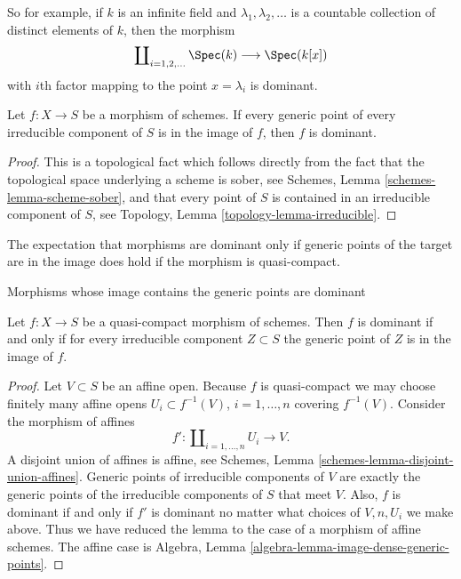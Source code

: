 \noindent
So for example, if $k$ is an infinite field and $\lambda_1, \lambda_2, \ldots$
is a countable collection of distinct elements of $k$, then the morphism
$$
\coprod\nolimits_{i = 1, 2, \ldots } \Spec(k)
\longrightarrow
\Spec(k[x])
$$
with $i$th factor mapping to the point $x = \lambda_i$ is dominant.

\begin{lemma}
\label{lemma-generic-points-in-image-dominant}
Let $f : X \to S$ be a morphism of schemes.
If every generic point of every irreducible component of $S$
is in the image of $f$, then $f$ is dominant.
\end{lemma}

\begin{proof}
This is a topological fact which follows directly from the fact that
the topological space underlying a scheme is sober, see
Schemes, Lemma \ref{schemes-lemma-scheme-sober}, and that
every point of $S$ is contained in an irreducible component of
$S$, see Topology, Lemma \ref{topology-lemma-irreducible}.
\end{proof}

\noindent
The expectation that morphisms are dominant only if generic points of the
target are in the image does hold if the morphism is quasi-compact.

\begin{lemma}
\label{lemma-quasi-compact-dominant}
\begin{slogan}
Morphisms whose image contains the generic points are dominant
\end{slogan}
Let $f : X \to S$ be a quasi-compact morphism of schemes.
Then $f$ is dominant if and only if for every irreducible
component $Z \subset S$ the generic point of $Z$ is in the
image of $f$.
\end{lemma}

\begin{proof}
Let $V \subset S$ be an affine open.
Because $f$ is quasi-compact we may choose finitely many affine
opens $U_i \subset f^{-1}(V)$, $i = 1, \ldots, n$ covering
$f^{-1}(V)$. Consider the morphism of affines
$$
f' :
\coprod\nolimits_{i = 1, \ldots, n} U_i
\longrightarrow
V.
$$
A disjoint union of affines is affine, see
Schemes, Lemma \ref{schemes-lemma-disjoint-union-affines}.
Generic points of irreducible components of $V$
are exactly the generic points of the irreducible components of
$S$ that meet $V$. Also, $f$ is dominant if and only if $f'$ is dominant
no matter what choices of $V, n, U_i$ we make above. Thus we
have reduced the lemma to the case of a morphism of affine schemes.
The affine case is
Algebra, Lemma \ref{algebra-lemma-image-dense-generic-points}.
\end{proof}

